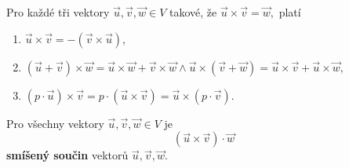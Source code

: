 \begin{veta}
    Pro každé tři vektory $\vec u, \vec v, \vec w \in V$ takové,
   že $\vec u\times \vec v = \vec w,$ platí
   \begin{enumerate}[$i.$]
   \item $\vec u\times \vec v = -(\vec v \times \vec u),$
   \item $(\vec u + \vec v)\times \vec w = \vec u \times \vec w + \vec v \times \vec w \land \vec u\times (\vec v + \vec w) = \vec u \times \vec v+\vec u\times \vec w,$
   \item $(p\cdot \vec u)\times \vec v = p\cdot(\vec u \times \vec v) = \vec u \times (p\cdot \vec v)$.
   \end{enumerate}
\end{veta}

\begin{definition}
    Pro všechny vektory $\vec u, \vec v, \vec w \in V$ je
    $$(\vec u \times \vec v) \cdot \vec w$$
    \textbf{smíšený součin} vektorů $\vec u, \vec v, \vec w.$
\end{definition}
